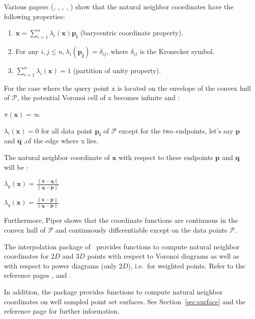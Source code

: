 Various papers (\cite{s-vidt-80}, \cite{f-sodt-90},
\cite{cgal:p-plcbd-93}, \cite{b-scaps-97}, \cite{hs-vbihc-00}) show that
the natural neighbor coordinates have the following properties:
  \begin{enumerate}
  \item $\mathbf{x} = \sum_{i=1}^n \lambda_i(\mathbf{x}) \mathbf{p_i}$
    (barycentric coordinate property).
  \item For any $i,j \leq n, \lambda_i(\mathbf{p_j})=
    \delta_{ij}$, where $\delta_{ij}$ is the Kronecker symbol.
  \item $\sum_{i=1}^n \lambda_i(\mathbf{x}) = 1$ (partition of unity
    property).
  \end{enumerate}
  For the case where the query point x is located on the envelope of the convex hull of $\mathcal{P}$,
  the potential Voronoi cell of x becomes infinite and :
	  
  $\pi(\mathbf{x}) = \infty$
  
  $\lambda_i(\mathbf{x}) = 0 $ for all data point $\mathbf{p_i}$ of $\mathcal{P}$ except for the two endpoints, let's say $\mathbf{p}$ and $\mathbf{q}$ ,of the edge where x lies.
  
  The natural neighbor coordinate of $\mathbf{x}$ with respect to these endpoints $\mathbf{p}$ and $\mathbf{q}$ will be :
	  
  $\lambda_p(\mathbf{x}) = \frac{\|\mathbf{x} - \mathbf{q}\| }{ \|\mathbf{q} - \mathbf{p}\|} $ 
  
  $\lambda_q(\mathbf{x}) = \frac{\|\mathbf{x} - \mathbf{p}\| }{ \|\mathbf{q} - \mathbf{p}\|} $ 
  
  Furthermore, Piper \cite{cgal:p-plcbd-93} shows that the coordinate
  functions are continuous in the convex hull of $\mathcal{P}$ and
  continuously differentiable except on the data points $\mathcal{P}$.
  \medskip
  
  The interpolation package of \cgal\ provides functions to compute
  natural neighbor coordinates for $2D$ and $3D$ points with respect
  to Voronoi diagrams as well as with respect to power diagrams (only
  $2D$), i.e.\ for weighted points. Refer to the reference pages
  ,
   and
  .
  
  In addition, the package provides functions to compute natural
  neighbor coordinates on well sampled point set surfaces. See
  Section~\ref{sec:surface} and the reference page
   for further information.

